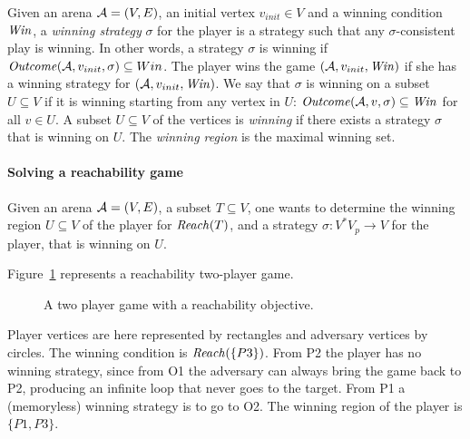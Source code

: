 Given an arena $\mathcal{A}=(V, E)$, an initial vertex $v_{init}\in V$ and a
winning condition $\mathit{Win}$, a
\emph{winning strategy} $\sigma$ for the player is a strategy such that
any $\sigma$-consistent play is winning. In other words, a strategy $\sigma$ is winning if
$\mathit{Outcome}(\mathcal{A}, v_{init}, \sigma) \subseteq Win$. The player wins the game $(\mathcal{A}, v_{init}, \mathit{Win})$
if she has a winning strategy for $(\mathcal{A}, v_{init}, \mathit{Win})$.
We say that $\sigma$ is winning on a subset $U \subseteq V$ if it is winning
starting from any vertex in $U$: 
$\mathit{Outcome}(\mathcal{A}, v, \sigma)\subseteq \mathit{Win}$ for all $v\in U$.  A subset
$U \subseteq V$ of the vertices is \emph{winning} if there exists
a strategy $\sigma$ that is winning on $U$. The \emph{winning 
region} is the maximal winning set.

\paragraph{Solving a reachability game} 
Given an arena $\mathcal{A}=(V, E)$, a subset $T\subseteq V$, one wants to 
determine the winning region $U\subseteq V$ of the player for $\mathit{Reach}(T)$, 
and a strategy $\sigma: V^*V_p\rightarrow V$ 
for the player, that is winning on $U$.

\begin{example}
Figure~\ref{fig:synth} represents a reachability two-player game. 
\begin{figure}[htbp]
\centering 
{} 
\caption{A two player game with a reachability objective.} 
\label{fig:synth}
\end{figure}
Player vertices are here represented by rectangles and adversary vertices by circles. 
The winning condition is $\mathit{Reach}(\{P3\})$. 
From P2 the player has no winning strategy, since from O1 the adversary
can always bring the game back to P2, producing an infinite loop that never goes to the target. 
From P1 a (memoryless) winning strategy is to go to O2.
The winning region of the player is $\{P1, P3\}$.
\end{example}

